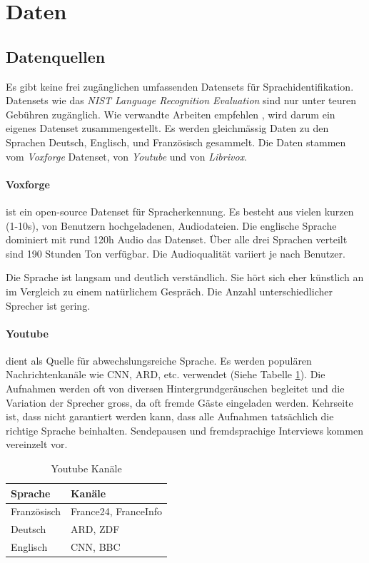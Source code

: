 \section{Daten}


\subsection{Datenquellen}
Es gibt keine frei zugänglichen umfassenden Datensets für Sprachidentifikation. Datensets wie das \textit{NIST Language Recognition Evaluation}\cite{nist} sind nur unter teuren Gebühren zugänglich. Wie verwandte Arbeiten empfehlen \cite{iLID}, wird darum ein eigenes Datenset zusammengestellt. Es werden gleichmässig Daten zu den Sprachen Deutsch, Englisch, und Französisch gesammelt. Die Daten stammen vom \textit{Voxforge}\cite{voxforge} Datenset, von \textit{Youtube}\cite{youtube} und von \textit{Librivox}\cite{librivox}.

\paragraph{Voxforge} ist ein open-source Datenset für Spracherkennung. Es besteht aus vielen kurzen (1-10s), von Benutzern hochgeladenen, Audiodateien. Die englische Sprache dominiert mit rund 120h Audio das Datenset. Über alle drei Sprachen verteilt sind 190 Stunden Ton verfügbar. Die Audioqualität variiert je nach Benutzer.

Die Sprache ist langsam und deutlich verständlich. Sie hört sich eher künstlich an im Vergleich zu einem natürlichem Gespräch. Die Anzahl unterschiedlicher Sprecher ist gering.

\paragraph{Youtube}dient als Quelle für abwechslungsreiche Sprache. Es werden populären Nachrichtenkanäle wie CNN, ARD, etc. verwendet (Siehe Tabelle \ref{tab:channels}). Die Aufnahmen werden oft von diversen Hintergrundgeräuschen begleitet und die Variation der Sprecher gross, da oft fremde Gäste eingeladen werden. Kehrseite ist, dass nicht garantiert werden kann, dass alle Aufnahmen tatsächlich die richtige Sprache beinhalten. Sendepausen und fremdsprachige Interviews kommen vereinzelt vor.
\begin{table}[h]
        \centering
        \begin{tabular}[t]{l || l}
        Sprache & Kanäle \\
        \hline \hline
        Französisch & France24, FranceInfo\\
        Deutsch & ARD, ZDF\\
        Englisch & CNN,  BBC
        \end{tabular}
        \caption{Youtube Kanäle}
        \label{tab:channels}
\end{table}

